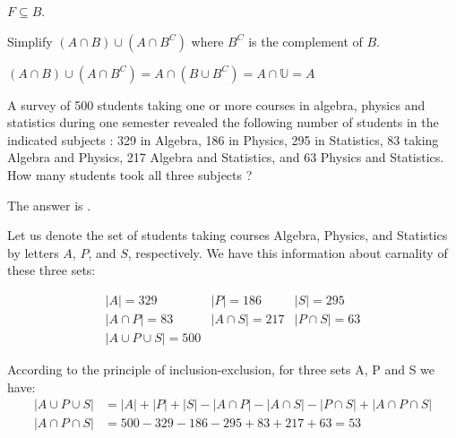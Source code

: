 \documentclass{ximera}
\begin{document}
\begin{question}
$F\subseteq B$.
\begin{solution}
\begin{multiple-choice}
\end{multiple-choice}
\end{solution}
\end{question}

\begin{question}
Simplify $(A \cap B) \cup (A \cap B^C)$ where $B^C$ is the complement of $B$.
\begin{solution}
\begin{multiple-choice}
  \choice{$\emptyset$}
\end{multiple-choice}
\end{solution}
$(A \cap B) \cup (A \cap B^C) = A \cap (B \cup B^C) = A \cap \mathbb{U} = A$
\end{question}

\begin{question}
A survey of 500 students taking one or more courses in algebra,
physics and statistics during one semester revealed the following
number of students in the indicated subjects : 329 in Algebra, 186 in
Physics, 295 in Statistics, 83 taking Algebra and Physics, 217 Algebra
and Statistics, and 63 Physics and Statistics.  How many students took
all three subjects ?
\begin{solution}
The answer is . 
\end{solution}

Let us denote the set of students taking courses Algebra, Physics, and
Statistics by letters $A$, $P$, and $S$, respectively. We have this
information about carnality of these three sets:

\begin{equation*}
	\begin{array}{lll}
	 |A| = 329							& |P| = 186				& |S| = 295 \\
	 |A \cap P| = 83				& |A \cap S| = 217	& |P \cap S| = 63 \\
	 |A \cup P \cup S| = 500	& &
	\end{array}
\end{equation*}

According to the principle of inclusion-exclusion, for three sets A, P and S we have:
\begin{align*}
|A \cup P \cup S| &= |A| + |P| + |S| - |A \cap P| - |A \cap S| - |P \cap S| + |A \cap P \cap S|\\
|A \cap P \cap S| &= 500 - 329 - 186 - 295 + 83 + 217 + 63 = 53
\end{align*}
\end{question}
\end{document}
